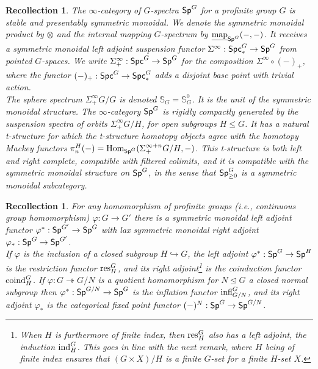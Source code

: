 \documentclass[reqno]{amsart}
\numberwithin{equation}{section}\theoremstyle{thms}
\theoremstyle{defn}
\newtheorem{rec}[equation]{Recollection}
\newcommand{\bS}{\mathbb{S}}
\newcommand{\tn}[1]{\textnormal{#1}}
\newcommand{\tsf}[1]{\textsf{\textup{#1}}}
\newcommand{\underl}[1]{\underline{#1}}
\newcommand{\Hom}{\tn{Hom}}
\newcommand{\imap}{\underl{\tn{map}}}
\newcommand{\spec}{\tsf{Sp}}
\newcommand{\specg}{\tsf{Sp}^G}
\newcommand{\spcg}{\tsf{Spc}^G}
\newcommand{\spcgp}{\tsf{Spc}^G_{\ast}}
\begin{document}
\begin{rec}
The \emph{$\infty$-category of $G$-spectra} $\specg$ for a profinite group $G$ is stable and presentably symmetric monoidal. We denote the symmetric monoidal product by $\otimes$ and the internal mapping $G$-spectrum by $\imap_{\specg}(-,-)$. It receives a symmetric monoidal left adjoint suspension functor $\Sigma^{\infty}: \spcgp \to \specg$ from pointed $G$-spaces. We write $\Sigma^{\infty}_+: \spcg \to \specg$ for the composition $\Sigma^{\infty} \circ (-)_+$, where the functor $(-)_+: \spcg \to \spcgp$ adds a disjoint base point with trivial action. \\
The sphere spectrum $\Sigma^{\infty}_+ G/G$ is denoted $\bS_G = \bS^0_G$. It is the unit of the symmetric monoidal structure. The $\infty$-category $\specg$ is rigidly compactly generated by the suspension spectra of orbits $\Sigma^{\infty}_+G/H$, for open subgroups $H \leq G$. It has a natural t-structure for which the t-structure homotopy objects agree with the homotopy Mackey functors $\pi_n^{H}(-) = \Hom_{\specg}(\Sigma^{\infty + n}_+ G/H,-)$. This t-structure is both left and right complete, compatible with filtered colimits, and it is compatible with the symmetric monoidal structure on $\specg$, in the sense that $\specg_{\geq 0}$ is a symmetric monoidal subcategory.
\end{rec}

\begin{rec}
For any homomorphism of profinite groups (i.e., continuous group homomorphism) $\varphi: G \to G'$  there is a symmetric monoidal left adjoint functor $\varphi^*: \spec^{G'} \to \specg$ with lax symmetric monoidal right adjoint $\varphi_*: \spec^{G} \to \spec^{G'}$. \\
If $\varphi$ is the inclusion of a closed subgroup $H \hookrightarrow G$, the left adjoint $\varphi^*: \spec^{G} \to \spec^{H}$ is the \emph{restriction functor} $\tn{res}^G_H$, and its right adjoint\footnote{When $H$ is furthermore of finite index, then $\tn{res}^G_H$ also has a left adjoint, the \emph{induction} $\tn{ind}^G_H$. This goes in line with the next remark, where $H$ being of finite index ensures that $(G \times X)/H$ is a finite $G$-set for a finite $H$-set $X$.} is the \emph{coinduction functor} $\tn{coind}^G_H$. If $\varphi: G \twoheadrightarrow G/N$ is a quotient homomorphism for $N \trianglelefteq G$ a closed normal subgroup then $\varphi^*: \spec^{G/N} \to \spec^{G}$ is the \emph{inflation functor} $\tn{infl}^G_{G/N}$, and its right adjoint $\varphi_*$ is the \emph{categorical fixed point functor} $(-)^N: \spec^{G} \to \spec^{G/N}$. 
\end{rec}
\end{document}
